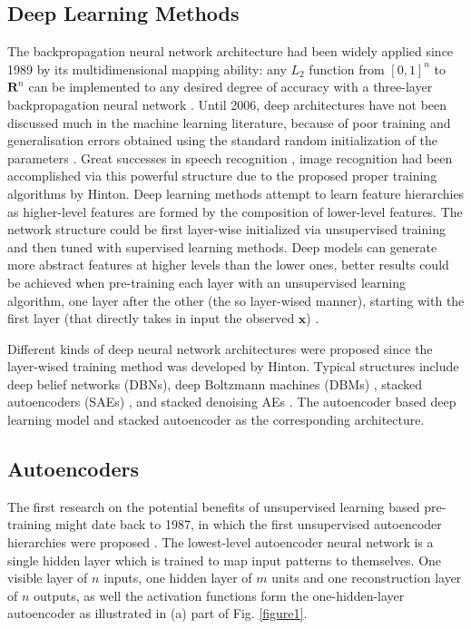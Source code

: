 \documentclass[journal]{IEEEtran}
\begin{document}
\subsection{Deep Learning Methods}
The backpropagation neural network architecture had been widely applied since 1989 by its multidimensional mapping ability: any $L_2$ function from $[0, 1]^n$ to $\mathbf{R}^n$ can be implemented to any desired degree of accuracy with a three-layer backpropagation neural network \cite{hecht}. Until 2006, deep architectures have not been discussed much in the machine learning literature, because of poor training and generalisation errors obtained using the standard random initialization of the parameters \cite{bengio2009}. Great successes in speech recognition \cite{hinton2012deep}, image recognition\cite{ciresan2010deep} had been accomplished via this powerful structure due to the proposed proper training algorithms by Hinton\cite{hinton}. Deep learning methods attempt to learn feature hierarchies as higher-level features are formed by the composition of lower-level features. The network structure could be first layer-wise initialized via unsupervised training and then tuned with supervised learning methods. Deep models can generate more abstract features at higher levels than the lower ones,  better results could be achieved when pre-training each layer with an unsupervised learning algorithm, one layer after the other (the so layer-wised manner), starting with the first layer (that directly takes in input the observed $\mathbf{x}$) \cite{bengio2009}.

Different kinds of deep neural network architectures were proposed since the layer-wised training method was developed by Hinton. Typical structures include deep belief networks (DBNs)\cite{hinton2006fast}, deep Boltzmann machines (DBMs) \cite{salakhutdinov2009deep}, stacked autoencoders (SAEs) \cite{bengio2007greedy}, and stacked denoising AEs \cite{vincent2010stacked}. The autoencoder based deep learning model and stacked autoencoder as the corresponding architecture.
 
\subsection{Autoencoders}
The first research on the potential benefits of unsupervised learning based pre-training might date back to 1987, in which the first unsupervised autoencoder hierarchies were proposed \cite{ballard1987modular}. The lowest-level autoencoder neural network is a single hidden layer which is trained to map input patterns to themselves. One visible layer of $n$ inputs, one hidden layer of $m$ units and one reconstruction layer of $n$ outputs, as well the activation functions form the one-hidden-layer autoencoder as illustrated in (a) part of Fig. \ref{figure1}.
\end{document}
